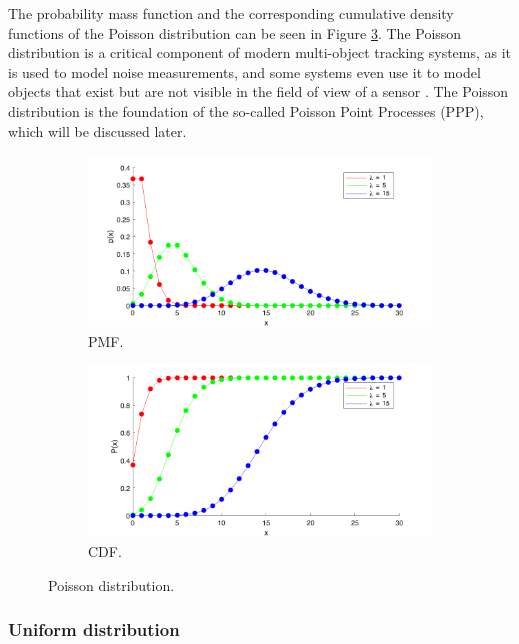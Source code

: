 The probability mass function and the corresponding cumulative density functions
of the Poisson distribution can be seen in Figure \ref{fig:poisson}.
The Poisson distribution is a critical component of modern multi-object
tracking systems, as it is used to model noise measurements, and some 
systems even use it to model objects that exist but are not visible in
the field of view of a sensor \cite{garcia-fernandezPoissonMultiBernoulliMixture2018}.
The Poisson distribution is the foundation of the so-called Poisson Point
Processes (PPP), which will be discussed later.

\begin{figure}
\centering
\begin{subfigure}{.5\textwidth}
  \centering
  \includegraphics[width=.9\linewidth]{figures/poisson.pmf.png}
  \caption{PMF.}
  \label{fig:poisson:pmf}
\end{subfigure}%
\begin{subfigure}{.5\textwidth}
  \centering
  \includegraphics[width=.9\linewidth]{figures/poisson.cdf.png}
  \caption{CDF.}
  \label{fig:poisson:cdf}
\end{subfigure}
\caption{Poisson distribution.}
\label{fig:poisson}
\end{figure}

\subsubsection{Uniform distribution}

